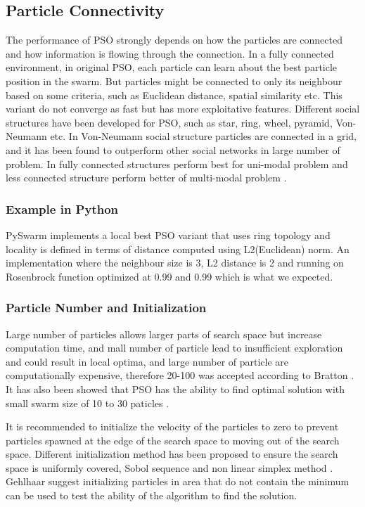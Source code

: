 \documentclass{article}
\begin{document}
\subsection{Particle Connectivity}
The performance of PSO strongly depends on how the particles are connected and how information is flowing through the connection. In a fully connected environment, in original PSO, each particle can learn about the best particle position in the swarm. But particles might be connected to only its neighbour based on some criteria, such as Euclidean distance, spatial similarity etc. This variant do not converge as fast but has more exploitative features. Different social structures have been developed for PSO, such as star, ring, wheel, pyramid, Von-Neumann etc. In Von-Neumann social structure particles are connected in a grid, and it has been found to outperform other social networks in large number of problem. In fully connected structures perform best for uni-modal problem and less connected structure perform better of multi-modal problem \cite{kennedy1999small}.

\subsubsection{Example in Python}
PySwarm implements a local best PSO variant that uses ring topology and locality is defined in terms of distance computed using L2(Euclidean) norm. An implementation where the neighbour size is 3, L2 distance is 2 and running on Rosenbrock function optimized at 0.99 and 0.99 which is what we expected.

\subsubsection{Particle Number and Initialization}
Large number of particles allows larger parts of search space but increase computation time, and mall number of particle lead to insufficient exploration and could result in local optima, and large number of particle are computationally expensive, therefore 20-100 was accepted according to Bratton \cite{bratton2007defining}. It has also been showed that PSO has the ability to find optimal solution with small swarm size of 10 to 30 paticles \cite{bergh2001effects}. 

It is recommended to initialize the velocity of the particles to zero to prevent particles spawned at the edge of the search space to moving out of the search space. Different initialization method has been proposed to ensure the search space is uniformly covered, Sobol sequence \cite{parsopoulos2002particle} and non linear simplex method \cite{parsopoulos2002initializing}. Gehlhaar suggest initializing particles in area that do not contain the minimum can be used to test the ability of the algorithm to find the solution.
\end{document}
